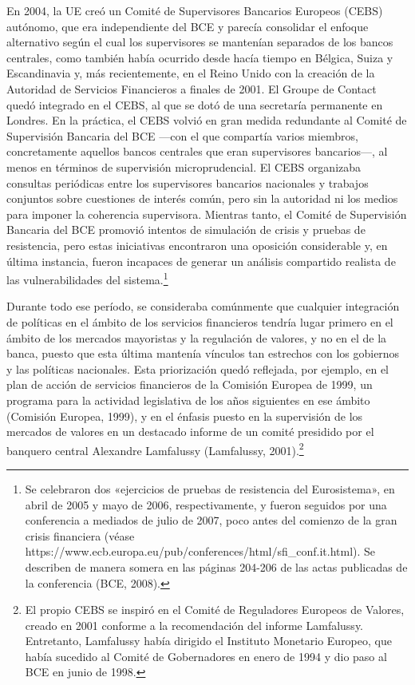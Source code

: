 \documentclass[10pt,a4paper]{article}
\begin{document}
{En 2004, la UE creó un Comité de Supervisores Bancarios Europeos (CEBS) autónomo, que era independiente del BCE y parecía consolidar el enfoque alternativo según el cual los supervisores se mantenían separados de los bancos centrales, como también había ocurrido desde hacía tiempo en Bélgica, Suiza y Escandinavia y, más recientemente, en el Reino Unido con la creación de la Autoridad de Servicios Financieros a finales de 2001. El Groupe de Contact quedó integrado en el CEBS, al que se dotó de una secretaría permanente en Londres. En la práctica, el CEBS volvió en gran medida redundante al Comité de Supervisión Bancaria del BCE —con el que compartía varios miembros, concretamente aquellos bancos centrales que eran supervisores bancarios—, al menos en términos de supervisión microprudencial. El CEBS organizaba consultas periódicas entre los supervisores bancarios nacionales y trabajos conjuntos sobre cuestiones de interés común, pero sin la autoridad ni los medios para imponer la coherencia supervisora. Mientras tanto, el Comité de Supervisión Bancaria del BCE promovió intentos de simulación de crisis y pruebas de resistencia, pero estas iniciativas encontraron una oposición considerable y, en última instancia, fueron incapaces de generar un análisis compartido realista de las vulnerabilidades del sistema.\footnote{%
    Se celebraron dos «ejercicios de pruebas de resistencia del Eurosistema», en abril de 2005 y mayo de 2006, respectivamente, y fueron seguidos por una conferencia a mediados de julio de 2007, poco antes del comienzo de la gran crisis financiera (véase https://www.ecb.europa.eu/pub/conferences/html/sfi_conf.it.html). Se describen de manera somera en las páginas 204-206 de las actas publicadas de la conferencia (BCE, 2008).
}

Durante todo ese período, se consideraba comúnmente que cualquier integración de políticas en el ámbito de los servicios financieros tendría lugar primero en el ámbito de los mercados mayoristas y la regulación de valores, y no en el de la banca, puesto que esta última mantenía vínculos tan estrechos con los gobiernos y las políticas nacionales. Esta priorización quedó reflejada, por ejemplo, en el plan de acción de servicios financieros de la Comisión Europea de 1999, un programa para la actividad legislativa de los años siguientes en ese ámbito (Comisión Europea, 1999), y en el énfasis puesto en la supervisión de los mercados de valores en un destacado informe de un comité presidido por el banquero central Alexandre Lamfalussy (Lamfalussy, 2001).\footnote{%
    El propio CEBS se inspiró en el Comité de Reguladores Europeos de Valores, creado en 2001 conforme a la recomendación del informe Lamfalussy. Entretanto, Lamfalussy había dirigido el Instituto Monetario Europeo, que había sucedido al Comité de Gobernadores en enero de 1994 y dio paso al BCE en junio de 1998.
}

}
\end{document}
